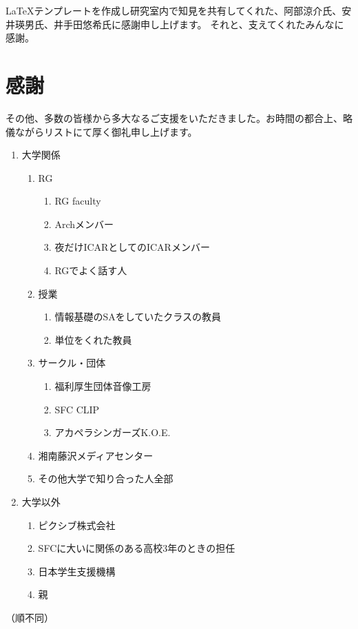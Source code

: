 \begin{acknowledgment}

LaTeXテンプレートを作成し研究室内で知見を共有してくれた、阿部涼介氏、安井瑛男氏、井手田悠希氏に感謝申し上げます。
それと、支えてくれたみんなに感謝。

\section*{感謝}

その他、多数の皆様から多大なるご支援をいただきました。お時間の都合上、略儀ながらリストにて厚く御礼申し上げます。

\begin{enumerate}
  \item 大学関係
  \begin{enumerate}
    \item RG
    \begin{enumerate}
      \item RG faculty
      \item Archメンバー
      \item 夜だけICARとしてのICARメンバー
      \item RGでよく話す人
    \end{enumerate}

    \item 授業
    \begin{enumerate}
      \item 情報基礎のSAをしていたクラスの教員
      \item 単位をくれた教員
    \end{enumerate}

    \item サークル・団体
    \begin{enumerate}
      \item 福利厚生団体音像工房
      \item SFC CLIP
      \item アカペラシンガーズK.O.E.
    \end{enumerate}

    \item 湘南藤沢メディアセンター
    \item その他大学で知り合った人全部
  \end{enumerate}

  \item 大学以外
  \begin{enumerate}
    \item ピクシブ株式会社
    \item SFCに大いに関係のある高校3年のときの担任
    \item 日本学生支援機構
    \item 親
  \end{enumerate}
\end{enumerate}

（順不同）

\end{acknowledgment}
